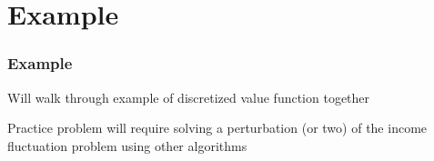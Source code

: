 \documentclass[10pt]{beamer}
\begin{document}
\section{Example}

\begin{frame} \frametitle{Example}

  Will walk through example of discretized value function together

  \vspace{0.5cm}

  Practice problem will require solving a perturbation (or two) of the income fluctuation problem using other algorithms

\end{frame}
\end{document}
